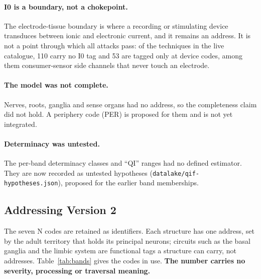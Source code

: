 \paragraph{I0 is a boundary, not a chokepoint.}
The electrode-tissue boundary is where a recording or stimulating device transduces between
ionic and electronic current, and it remains an address. It is not a point through which
all attacks pass: of the \LiveTechniques{} techniques in the live catalogue, 110 carry no
I0 tag and 53 are tagged only at device codes, among them consumer-sensor side channels
that never touch an electrode.

\paragraph{The model was not complete.}
Nerves, roots, ganglia and sense organs had no address, so the completeness claim did not
hold. A periphery code (PER) is proposed for them and is not yet integrated.

\paragraph{Determinacy was untested.}
The per-band determinacy classes and ``QI'' ranges had no defined estimator. They are now
recorded as untested hypotheses (\texttt{datalake/qif-hypotheses.json}), proposed for the
earlier band memberships.

\subsection{Addressing Version 2}

The seven N codes are retained as identifiers. Each structure has one address, set by the
adult territory that holds its principal neurons; circuits such as the basal ganglia and
the limbic system are functional tags a structure can carry, not addresses.
Table~\ref{tab:bands} gives the codes in use. \textbf{The number carries no severity,
processing or traversal meaning.}

